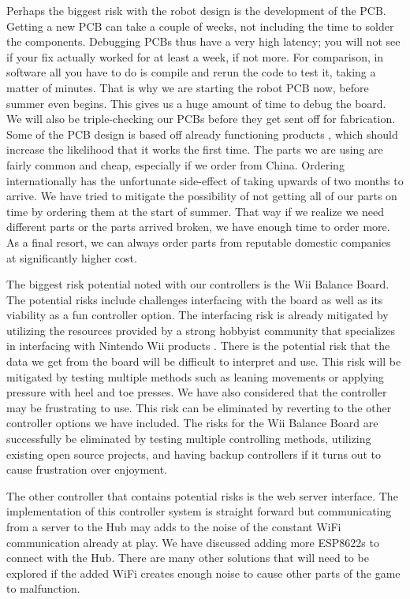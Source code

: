\documentclass[11pt]{ieeeconf}
\begin{document}
Perhaps the biggest risk with the robot design is the development of the PCB. Getting a new PCB can take a couple of weeks, not including the time to solder the components. Debugging PCBs thus have a very high latency; you will not see if your fix actually worked for at least a week, if not more. For comparison, in software all you have to do is compile and rerun the code to test it, taking a matter of minutes. That is why we are starting the robot PCB now, before summer even begins. This gives us a huge amount of time to debug the board. We will also be triple-checking our PCBs before they get sent off for fabrication. Some of the PCB design is based off already functioning products \cite{feather}, which should increase the likelihood that it works the first time. The parts we are using are fairly common and cheap, especially if we order from China. Ordering internationally has the unfortunate side-effect of taking upwards of two months to arrive. We have tried to mitigate the possibility of not getting all of our parts on time by ordering them at the start of summer. That way if we realize we need different parts or the parts arrived broken, we have enough time to order more. As a final resort, we can always order parts from reputable domestic companies at significantly higher cost.

The biggest risk potential noted with our controllers is the Wii Balance Board. The potential risks include challenges interfacing with the board as well as its viability as a fun controller option. The interfacing risk is already mitigated by utilizing the resources provided by a strong hobbyist community that specializes in interfacing with Nintendo Wii products \cite{homebrew}. There is the potential risk that the data we get from the board will be difficult to interpret and use. This risk will be mitigated by testing multiple methods such as leaning movements or applying pressure with heel and toe presses. We have also considered that the controller may be frustrating to use. This risk can be eliminated by reverting to the other controller options we have included. The risks for the Wii Balance Board are successfully be eliminated by testing multiple controlling methods, utilizing existing open source projects, and having backup controllers if it turns out to cause frustration over enjoyment.

The other controller that contains potential risks is the web server interface. The implementation of this controller system is straight forward but communicating from a server to the Hub may adds to the noise of the constant WiFi communication already at play. We have discussed adding more ESP8622s to connect with the Hub. There are many other solutions that will need to be explored if the added WiFi creates enough noise to cause other parts of the game to malfunction.  
\end{document}
